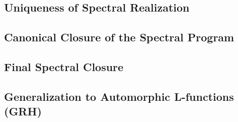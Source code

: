 \subsection{Uniqueness of Spectral Realization}
\label{sec:uniqueness_spectral_realization}










\subsection{Canonical Closure of the Spectral Program}
\label{sec:canonical_closure}




\subsection{Final Spectral Closure}
\label{sec:spectral_final_closure}







\subsection{Generalization to Automorphic L-functions (GRH)}
\label{sec:grh_equivalence}




